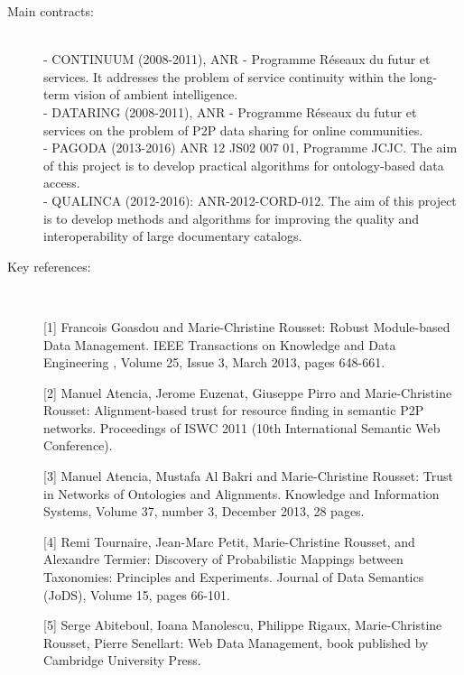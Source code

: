 
\begin{description}
\item[Main contracts:] \ \\
- CONTINUUM (2008-2011), ANR - Programme R{\'e}seaux du futur et services.  It addresses the problem of service continuity within the long-term vision of ambient intelligence. \\
- DATARING (2008-2011), ANR - Programme R{\'e}seaux du futur et services on the problem of P2P data sharing for online communities. \\
- PAGODA (2013-2016)  ANR 12 JS02 007 01, Programme JCJC. The aim of this project is to develop practical algorithms for ontology-based data access. \\
- QUALINCA (2012-2016): ANR-2012-CORD-012. The aim of this project is to develop methods and algorithms for improving the quality and interoperability of large documentary catalogs. 
  
\item[Key references:]~%

[1] Francois Goasdou and Marie-Christine Rousset: Robust Module-based Data Management. IEEE Transactions on Knowledge and Data Engineering , Volume 25, Issue 3, March 2013, pages 648-661. 

[2] Manuel Atencia, Jerome Euzenat, Giuseppe Pirro and Marie-Christine Rousset: Alignment-based trust for resource finding in semantic P2P networks. Proceedings of ISWC 2011 (10th International Semantic Web Conference). 

[3] Manuel Atencia, Mustafa Al Bakri and Marie-Christine Rousset: Trust in Networks of Ontologies and Alignments.  Knowledge and Information Systems, Volume 37, number 3, December 2013, 28 pages. 

[4] Remi Tournaire, Jean-Marc Petit, Marie-Christine Rousset, and Alexandre Termier: Discovery of Probabilistic Mappings between Taxonomies: Principles and Experiments. Journal of Data Semantics (JoDS), Volume 15, pages 66-101. 

[5] Serge Abiteboul, Ioana Manolescu, Philippe Rigaux, Marie-Christine Rousset, Pierre Senellart: Web Data Management,  book published by Cambridge University Press. 

\end{description}


